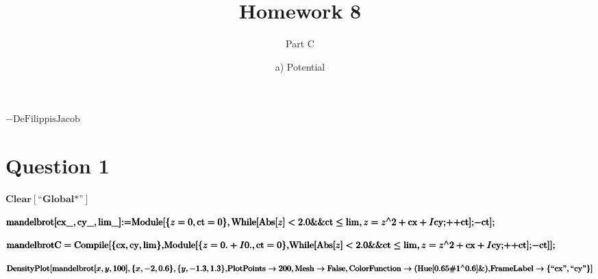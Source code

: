 \documentclass{article}
\begin{document}
\title{Homework 8}
\author{Part C}
\date{a) Potential}
\maketitle

\begin{doublespace}
\noindent\(-\text{DeFilippis} \text{Jacob}\)
\end{doublespace}

\section*{Question 1}

\begin{doublespace}
\noindent\(\pmb{\text{Clear}[\text{{``}Global$\grave{ }$*{''}}]}\)
\end{doublespace}

\begin{doublespace}
\noindent\(\pmb{\text{mandelbrot}[\text{cx$\_$},\text{cy$\_$},\text{lim$\_$}]\text{:=}}\\
\pmb{\text{Module}[\{z=0,\text{ct}=0\},\text{While}[\text{Abs}[z]<2.0\&\&\text{ct}\leq \lim ,z=z{}^{\wedge}2+\text{cx}+I \text{cy};}\\
\pmb{\text{++}\text{ct}];}\\
\pmb{-\text{ct}];}\)
\end{doublespace}

\begin{doublespace}
\noindent\(\pmb{\text{mandelbrotC}=\text{Compile}[\{\text{cx},\text{cy},\lim \},}\\
\pmb{\text{Module}[\{z=0.+I 0.,\text{ct}=0\},}\\
\pmb{\text{While}[\text{Abs}[z]<2.0\&\&\text{ct}\leq \lim ,z=z{}^{\wedge}2+\text{cx}+I \text{cy};}\\
\pmb{\text{++}\text{ct}];}\\
\pmb{-\text{ct}]];}\)
\end{doublespace}

\begin{doublespace}
\noindent\(\pmb{\text{DensityPlot}[\text{mandelbrot}[x,y,100],\{x,-2,0.6\},\{y,-1.3,1.3\},}\\
\pmb{\text{PlotPoints}\to 200,\text{Mesh}\to \text{False},\text{ColorFunction}\to (\text{Hue}[0.65 \text{$\#$1}{}^{\wedge}0.6]\&),}\\
\pmb{\text{FrameLabel}\to \{\text{{``}cx{''}},\text{{``}cy{''}}\}]}\)
\end{doublespace}
\end{document}
